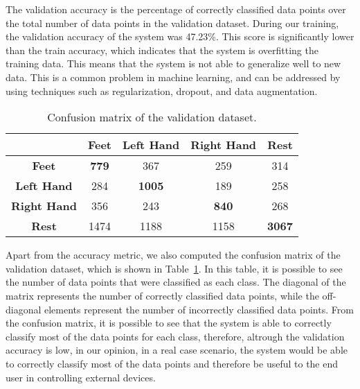 The validation accuracy is the percentage of correctly classified data points over the total number of data points in the validation dataset.
During our training, the validation accuracy of the system was 47.23\%.
This score is significantly lower than the train accuracy, which indicates that the system is overfitting the training data.
This means that the system is not able to generalize well to new data.
This is a common problem in machine learning, and can be addressed by using techniques such as regularization, dropout, and data augmentation.

\begin{table}[!htbp]
    \centering
    \begin{tabular}{|c||c|c|c|c|}
        \hline
        & \textbf{Feet} & \textbf{Left Hand} & \textbf{Right Hand} & \textbf{Rest} \\
        \hline
        \hline
        \textbf{Feet} & \textbf{779} & 367 & 259 & 314 \\
        \hline
        \textbf{Left Hand} & 284 & \textbf{1005} & 189 & 258 \\
        \hline
        \textbf{Right Hand} & 356 & 243 & \textbf{840} & 268 \\
        \hline
        \textbf{Rest} & 1474 & 1188 & 1158 & \textbf{3067} \\
        \hline
    \end{tabular}
    \caption{Confusion matrix of the validation dataset.}\label{tab:confusion_matrix}
\end{table}

Apart from the accuracy metric, we also computed the confusion matrix of the validation dataset, which is shown in Table~\ref{tab:confusion_matrix}.
In this table, it is possible to see the number of data points that were classified as each class.
The diagonal of the matrix represents the number of correctly classified data points, while the off-diagonal elements represent the number of incorrectly classified data points.
From the confusion matrix, it is possible to see that the system is able to correctly classify most of the data points for each class, therefore, altrough the validation accuracy is low, in our opinion, in a real case scenario, the system would be able to correctly classify most of the data points and therefore be useful to the end user in controlling external devices.

